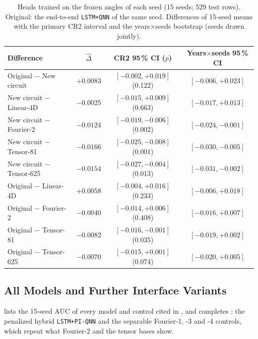 \documentclass[11pt,a4paper]{article}
\begin{document}
\begin{table}[htbp]
\centering
\caption{Heads trained on the frozen angles of each seed (15 seeds; 529 test rows). Original: the end-to-end \texttt{LSTM+QNN} of the same seed. Differences of 15-seed means with the primary CR2 interval and the years$\times$seeds bootstrap (seeds drawn jointly).}
\label{tab:common_angles}
{\small
\begin{tabular}{lccc}
\toprule
Difference & $\hat\Delta$ & CR2 95\,\% CI ($p$) & Years$\times$seeds 95\,\% CI \\
\midrule
Original $-$ New circuit & $+0.0083$ & $[-0.002,+0.019]$ (0.122) & $[-0.006,+0.023]$ \\
New circuit $-$ Linear-4D & $-0.0025$ & $[-0.015,+0.009]$ (0.663) & $[-0.017,+0.013]$ \\
New circuit $-$ Fourier-2 & $-0.0124$ & $[-0.019,-0.006]$ (0.002) & $[-0.024,-0.001]$ \\
New circuit $-$ Tensor-81 & $-0.0166$ & $[-0.025,-0.008]$ (0.001) & $[-0.030,-0.005]$ \\
New circuit $-$ Tensor-625 & $-0.0154$ & $[-0.027,-0.004]$ (0.013) & $[-0.031,-0.002]$ \\
Original $-$ Linear-4D & $+0.0058$ & $[-0.004,+0.016]$ (0.233) & $[-0.006,+0.018]$ \\
Original $-$ Fourier-2 & $-0.0040$ & $[-0.014,+0.006]$ (0.408) & $[-0.016,+0.007]$ \\
Original $-$ Tensor-81 & $-0.0082$ & $[-0.016,-0.001]$ (0.035) & $[-0.019,+0.002]$ \\
Original $-$ Tensor-625 & $-0.0070$ & $[-0.015,+0.001]$ (0.074) & $[-0.020,+0.005]$ \\
\bottomrule
\end{tabular}}
\end{table}

\subsection{All Models and Further Interface Variants}
\label{app:variants}

 lists the 15-seed AUC of every model and control cited in , and  completes : the penalized hybrid \texttt{LSTM+PI-QNN} and the separable Fourier-1, -3 and -4 controls, which repeat what Fourier-2 and the tensor bases show.
\end{document}
